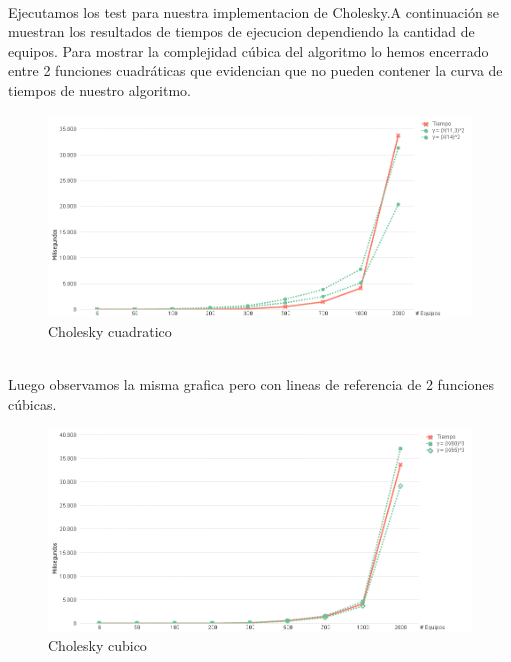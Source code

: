 \\
Ejecutamos los test para nuestra implementacion de Cholesky.A continuación se muestran los resultados de tiempos de ejecucion dependiendo la cantidad de equipos.
Para mostrar la complejidad cúbica del algoritmo lo hemos encerrado entre 2 funciones cuadráticas que evidencian que no pueden contener la curva de tiempos de nuestro algoritmo.\\


\begin{figure}[H]
\centering
\includegraphics[width=1\textwidth]{IMG/cholesky cuadratico.png}
\caption{Cholesky cuadratico}
\label{fig:Cholesky cuadratico}
\end{figure}

\\

Luego observamos la misma grafica pero con lineas de referencia de 2 funciones cúbicas.\\

\begin{figure}[H]
\centering
\includegraphics[width=1\textwidth]{IMG/cholesky cubicos.png}
\caption{Cholesky cubico}
\label{fig:Cholesky cubico}
\end{figure}

\\

